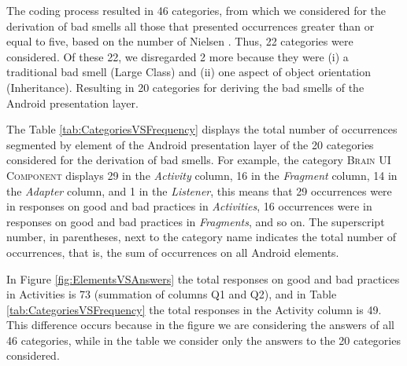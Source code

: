 The coding process resulted in 46 categories, from which we considered for the derivation of bad smells all those that presented occurrences greater than or equal to five, based on the number of Nielsen \cite{NielsenMagicNumber:00}. Thus, 22 categories were considered. Of these 22, we disregarded 2 more because they were (i) a traditional bad smell (Large Class) and (ii) one aspect of object orientation (Inheritance). Resulting in 20 categories for deriving the bad smells of the Android presentation layer.

The Table \ref{tab:CategoriesVSFrequency} displays the total number of occurrences segmented by element of the Android presentation layer of the 20 categories considered for the derivation of bad smells. For example, the category \textsc{\small Brain UI Component} displays 29 in the \textit{Activity} column, 16 in the \textit{Fragment} column, 14 in the \textit{Adapter} column, and 1 in the \textit{Listener}, this means that 29 occurrences were in responses on good and bad practices in \textit{Activities}, 16 occurrences were in responses on good and bad practices in \textit{Fragments}, and so on. The superscript number, in parentheses, next to the category name indicates the total number of occurrences, that is, the sum of occurrences on all Android elements.


In Figure \ref{fig:ElementsVSAnswers} the total responses on good and bad practices in Activities is 73 (summation of columns Q1 and Q2), and in Table \ref{tab:CategoriesVSFrequency} the total responses in the Activity column is 49. This difference occurs because in the figure we are considering the answers of all 46 categories, while in the table we consider only the answers to the 20 categories considered.

